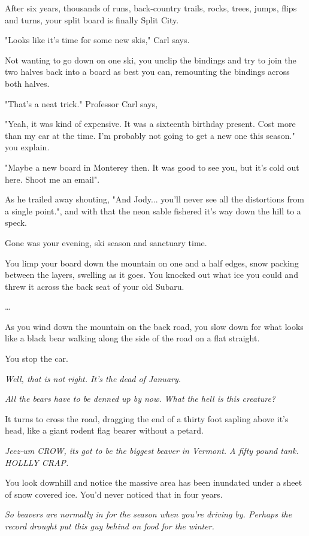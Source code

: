 \documentclass[a5paper, symmetric]{tufte-book}
\begin{document}
After six years, thousands of runs, back-country trails, rocks, trees, jumps, flips and turns, your split board is finally Split City. 

"Looks like it's time for some new skis," Carl says. 

Not wanting to go down on one ski, you unclip the bindings and try to join the two halves back into a board as best you can, remounting the bindings across both halves. 

"That's a neat trick." Professor Carl says,

"Yeah, it was kind of expensive. It was a sixteenth birthday present. Cost more than my car at the time. I'm probably not going to get a new one this season." you explain.

"Maybe a new board in Monterey then. It was good to see you, but it's cold out here. Shoot me an email". 

As he trailed away shouting, "And Jody... you'll never see all the distortions from a single point.", and with that the neon sable fishered it's way down the hill to a speck.

Gone was your evening, ski season and sanctuary time.

You limp your board down the mountain on one and a half edges, snow packing between the layers, swelling as it goes. You knocked out what ice you could and threw it across the back seat of your old Subaru. 

\ldots

As you wind down the mountain on the back road, you slow down for what looks like a black bear walking along the side of the road on a flat straight. 

You stop the car. 

\textit{Well, that is not right. It's the dead of January.}

\textit{All the bears have to be denned up by now. What the hell is this creature?}

It turns to cross the road, dragging the end of a thirty foot sapling above it's head, like a giant rodent flag bearer without a petard. 
 
\textit{Jeez-um CROW, its got to be the biggest beaver in Vermont. A fifty pound tank. HOLLLY CRAP.}

You look downhill and notice the massive area has been inundated under a sheet of snow covered ice. You'd never noticed that in four years. 

\textit{So beavers are normally in for the season when you're driving by. Perhaps the record drought put this guy behind on food for the winter.}
\end{document}
